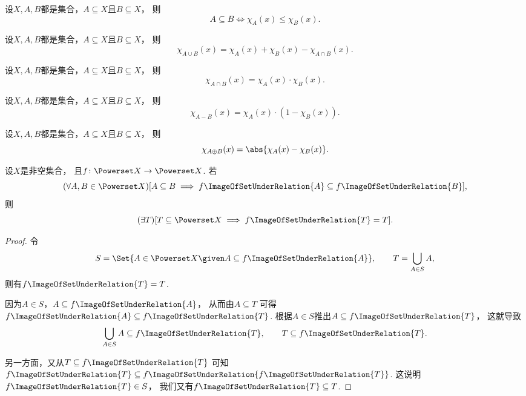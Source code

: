 \begin{proposition}
设\(X,A,B\)都是集合，\(A \subseteq X\)且\(B \subseteq X\)，
则\[
	A \subseteq B
	\iff
	\chi_A(x) \leq \chi_B(x).
\]
\end{proposition}

\begin{proposition}
设\(X,A,B\)都是集合，\(A \subseteq X\)且\(B \subseteq X\)，
则\[
	\chi_{A \cup B}(x)
	= \chi_A(x) + \chi_B(x) - \chi_{A \cap B}(x).
\]
\end{proposition}

\begin{proposition}
设\(X,A,B\)都是集合，\(A \subseteq X\)且\(B \subseteq X\)，
则\[
	\chi_{A \cap B}(x)
	= \chi_A(x) \cdot \chi_B(x).
\]
\end{proposition}

\begin{proposition}
设\(X,A,B\)都是集合，\(A \subseteq X\)且\(B \subseteq X\)，
则\[
	\chi_{A - B}(x)
	= \chi_A(x) \cdot (1 - \chi_B(x)).
\]
\end{proposition}

\begin{proposition}
设\(X,A,B\)都是集合，\(A \subseteq X\)且\(B \subseteq X\)，
则\[
	\chi_{A \oplus B}(x)
	= \abs{\chi_A(x) - \chi_B(x)}.
\]
\end{proposition}

\begin{example}
设\(X\)是非空集合，
且\(f\colon \Powerset X \to \Powerset X\).
若\[
	(\forall A,B \in \Powerset X)
	[
		A \subseteq B
		\implies
		f\ImageOfSetUnderRelation{A} \subseteq f\ImageOfSetUnderRelation{B}
	],
\]
则\[
	(\exists T)
	[
		T \subseteq \Powerset X
		\implies
		f\ImageOfSetUnderRelation{T} = T
	].
\]
\begin{proof}
令\[
	S = \Set{ A \in \Powerset X \given A \subseteq f\ImageOfSetUnderRelation{A} },
	\qquad
	T = \bigcup_{A \in S} A,
\]
则有\(f\ImageOfSetUnderRelation{T} = T\).

因为\(A \in S\)，\(A \subseteq f\ImageOfSetUnderRelation{A}\)，
从而由\(A \subseteq T\)
可得\(f\ImageOfSetUnderRelation{A} \subseteq f\ImageOfSetUnderRelation{T}\).
根据\(A \in S\)推出\(A \subseteq f\ImageOfSetUnderRelation{T}\)，
这就导致\[
	\bigcup_{A \in S} A \subseteq f\ImageOfSetUnderRelation{T},
	\qquad
	T \subseteq f\ImageOfSetUnderRelation{T}.
\]

另一方面，又从\(T \subseteq f\ImageOfSetUnderRelation{T}\)
可知\(f\ImageOfSetUnderRelation{T} \subseteq f\ImageOfSetUnderRelation{f\ImageOfSetUnderRelation{T}}\).
这说明\(f\ImageOfSetUnderRelation{T} \in S\)，
我们又有\(f\ImageOfSetUnderRelation{T} \subseteq T\).
\end{proof}
\end{example}

